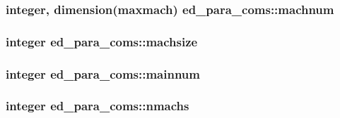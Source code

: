 \subsubsection[{\texorpdfstring{machnum}{machnum}}]{\setlength{\rightskip}{0pt plus 5cm}integer, dimension(maxmach) ed\+\_\+para\+\_\+coms\+::machnum}\hypertarget{namespaceed__para__coms_a38ed61f526634d9930f8f93a6a65cba4}{}\label{namespaceed__para__coms_a38ed61f526634d9930f8f93a6a65cba4}
\subsubsection[{\texorpdfstring{machsize}{machsize}}]{\setlength{\rightskip}{0pt plus 5cm}integer ed\+\_\+para\+\_\+coms\+::machsize}\hypertarget{namespaceed__para__coms_ac54b6ab59f73c004e11f26ed942382c6}{}\label{namespaceed__para__coms_ac54b6ab59f73c004e11f26ed942382c6}
\subsubsection[{\texorpdfstring{mainnum}{mainnum}}]{\setlength{\rightskip}{0pt plus 5cm}integer ed\+\_\+para\+\_\+coms\+::mainnum}\hypertarget{namespaceed__para__coms_a1a6297adee3ed24d243e8acdc8a47ea9}{}\label{namespaceed__para__coms_a1a6297adee3ed24d243e8acdc8a47ea9}
\subsubsection[{\texorpdfstring{nmachs}{nmachs}}]{\setlength{\rightskip}{0pt plus 5cm}integer ed\+\_\+para\+\_\+coms\+::nmachs}\hypertarget{namespaceed__para__coms_a19b6021232603bcc102754344756972d}{}\label{namespaceed__para__coms_a19b6021232603bcc102754344756972d}
